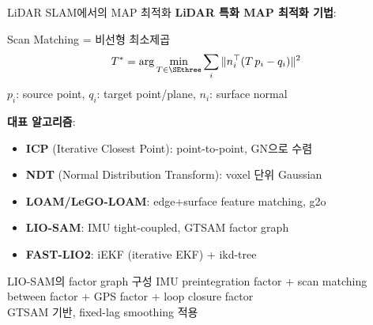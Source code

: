 \begin{frame}{LiDAR SLAM에서의 MAP 최적화}
  \textbf{LiDAR 특화 MAP 최적화 기법}:
  \pause
  \begin{block}{Scan Matching = 비선형 최소제곱}
    \[
      T^* = \arg\min_{T \in \SEthree} \sum_{i} \|n_i^\top(T\,p_i - q_i)\|^2
    \]
    $p_i$: source point, $q_i$: target point/plane, $n_i$: surface normal
  \end{block}
  \pause
  \textbf{대표 알고리즘}:
  \begin{itemize}
    \item \textbf{ICP} (Iterative Closest Point): point-to-point, GN으로 수렴
    \item \textbf{NDT} (Normal Distribution Transform): voxel 단위 Gaussian
    \item \textbf{LOAM/LeGO-LOAM}: edge+surface feature matching, g2o
    \item \textbf{LIO-SAM}: IMU tight-coupled, GTSAM factor graph
    \item \textbf{FAST-LIO2}: iEKF (iterative EKF) + ikd-tree
  \end{itemize}
  \pause
  \begin{exampleblock}{LIO-SAM의 factor graph 구성}
    IMU preintegration factor + scan matching between factor + GPS factor + loop closure factor\\
    GTSAM 기반, fixed-lag smoothing 적용
  \end{exampleblock}
\end{frame}

